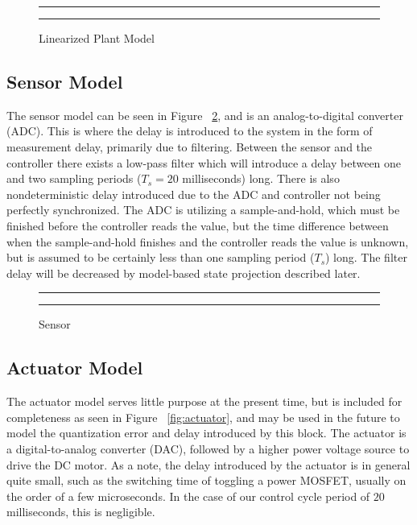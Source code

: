 \documentclass[conference]{IEEEtran}
\begin{document}
\begin{figure}[h!]
\centering
  \hrule
  {}
  \hrule
  \caption{Linearized Plant Model}
  \label{fig:plant}
\end{figure}

\subsection{Sensor Model}

The sensor model can be seen in Figure ~\ref{fig:sensor}, and is an analog-to-digital converter (ADC).  This is where the delay is introduced to the system in the form of measurement delay, primarily due to filtering.  Between the sensor and the controller there exists a low-pass filter which will introduce a delay between one and two sampling periods ($T_s=20$ milliseconds) long.  There is also nondeterministic delay introduced due to the ADC and controller not being perfectly synchronized.  The ADC is utilizing a sample-and-hold, which must be finished before the controller reads the value, but the time difference between when the sample-and-hold finishes and the controller reads the value is unknown, but is assumed to be certainly less than one sampling period ($T_s$) long.  The filter delay will be decreased by model-based state projection described later.

\begin{figure}[h!]
\centering
  \hrule
	{}
  \hrule
  \caption{Sensor}
  \label{fig:sensor}
\end{figure}

\subsection{Actuator Model}
The actuator model serves little purpose at the present time, but is included for completeness as seen in Figure ~\ref{fig:actuator}, and may be used in the future to model the quantization error and delay introduced by this block.  The actuator is a digital-to-analog converter (DAC), followed by a higher power voltage source to drive the DC motor.  As a note, the delay introduced by the actuator is in general quite small, such as the switching time of toggling a power MOSFET, usually on the order of a few microseconds.  In the case of our control cycle period of $20$ milliseconds, this is negligible.
\end{document}
